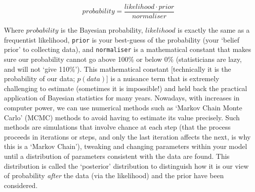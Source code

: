 \documentclass[11pt]{article}
\begin{document}
{\begin{equation}
  probability = \frac{likelihood \cdot prior}{normaliser}
  \label{bayes_theorem}
\end{equation}

Where $probability$ is the Bayesian probability, $likelihood$ is exactly the same as a frequentist likelihood, \texttt{prior} is your best-guess of the probability (your `belief prior' to collecting data), and \texttt{normaliser} is a mathematical constant that makes sure our probability cannot go above 100\% or below 0\% (statisticians are lazy, and will not `give 110\%'). This mathematical constant [technically it is the probability of our data; $p(data)$] is a nuisance term that is extremely challenging to estimate (sometimes it is impossible!) and held back the practical application of Bayesian statistics for many years. Nowadays, with increases in computer power, we can use numerical methods such as `Markov Chain Monte Carlo' (MCMC) methods to avoid having to estimate its value precisely. Such methods are simulations  that involve chance at each step (that the process proceeds in iterations or steps, and only the last iteration affects the next, is why this is a `Markov Chain'), tweaking and changing parameters within your model until a distribution of parameters consistent with the data are found. This distribution is called the `posterior' distribution to distinguish how it is our view of probability \emph{after} the data (via the likelihood) and the prior have been considered. %


}
\end{document}
